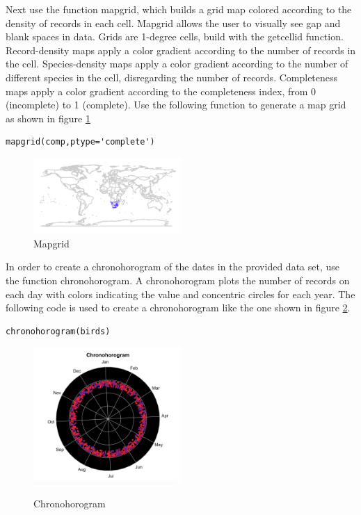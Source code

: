 Next use the function mapgrid, which builds a grid map colored according to the density of records in each cell.
Mapgrid allows the user to visually see gap and blank spaces in data.
Grids are 1-degree cells, build with the getcellid function.
Record-density maps apply a color gradient according to the number of records in the cell.
Species-density maps apply a color gradient according to the number of different species in the cell, disregarding the number of records.
Completeness maps apply a color gradient according to the completeness index, from 0 (incomplete) to 1 (complete).
Use the following function to generate a map grid as shown in figure \ref{fig:Mapgrid}

\begin{lstlisting}
mapgrid(comp,ptype='complete')
\end{lstlisting}

\begin{figure}[htbp!]
   \centering
   \includegraphics[width=0.5\textwidth]{pictures/biodiversity/map.jpg} 
      \caption{Mapgrid}
   \label{fig:Mapgrid}
\end{figure} 

In order to create a chronohorogram of the dates in the provided data set, use the function chronohorogram.
A chronohorogram plots the number of records on each day with colors indicating the value and concentric circles for each year.
The following code is used to create a chronohorogram like the one shown in figure \ref{fig:chronohorogram}.

\begin{lstlisting}
chronohorogram(birds)
\end{lstlisting}

\begin{figure}[htbp!] 
   \centering
      \caption{Chronohorogram}
   \includegraphics[width=0.5\textwidth]{pictures/biodiversity/chronohorogram.jpg} 
   \label{fig:chronohorogram}
\end{figure} 

